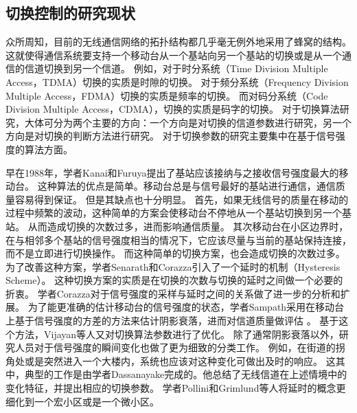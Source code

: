 \subsection{切换控制的研究现状}

\par
众所周知，目前的无线通信网络的拓扑结构都几乎毫无例外地采用了蜂窝的结构。
这就使得通信系统要支持一个移动台从一个基站向另一个基站的切换或是从一个通信的信道切换到另一个信道。
例如，对于时分系统（Time Division Multiple Access，TDMA）切换的实质是时隙的切换。
对于频分系统（Frequency Division Multiple Access，FDMA）切换的实质是频率的切换。
而对码分系统（Code Division Multiple Access，CDMA），切换的实质是码字的切换。
对于切换算法研究，大体可分为两个主要的方向：一个方向是对切换的信道参数进行研究，另一个方向是对切换的判断方法进行研究。
对于切换参数的研究主要集中在基于信号强度的算法方面。
\par
早在1988年，学者Kanai和Furuya提出了基站应该接纳与之接收信号强度最大的移动台\cite{Kanai1988}。
这种算法的优点是简单。移动台总是与信号最好的基站进行通信，通信质量容易得到保证。
但是其缺点也十分明显。
首先，如果无线信号的质量在移动的过程中频繁的波动，这种简单的方案会使移动台不停地从一个基站切换到另一个基站。
从而造成切换的次数过多，进而影响通信质量。
其次移动台在小区边界时，在与相邻多个基站的信号强度相当的情况下，它应该尽量与当前的基站保持连接，而不是立即进行切换操作。
而这种简单的切换方案，也会造成切换的次数过多。
为了改善这种方案，学者Senarath和Corazza引入了一个延时的机制（Hysteresis Scheme）\cite{345338}。
这种切换方案的实质是在切换的次数与切换的延时之间做一个必要的折衷。
学者Corazza对于信号强度的采样与延时之间的关系做了进一步的分析和扩展\cite{345424}。
为了能更准确的估计移动台的信号强度的状态，学者Sampath采用在移动台上基于信号强度的方差的方法来估计阴影衰落，进而对信道质量做评估 \cite{368926}。
基于这个方法，Vijayan等人又对切换算法参数进行了优化\cite{528368}。
除了通常阴影衰落以外，研究人员对于信号强度的瞬间变化也做了更为细致的分类工作。
例如，在街道的拐角处或是突然进入一个大楼内，系统也应该对这种变化可做出及时的响应\cite{350270}。
这其中，典型的工作是由学者Dassanayake完成的\cite{220848}。他总结了无线信道在上述情境中的变化特征，并提出相应的切换参数。
学者Pollini和Grimlund等人将延时的概念更细化到一个宏小区或是一个微小区\cite{486807}\cite{140543}。

